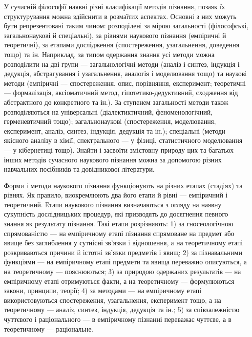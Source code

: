 У сучасній філософії наявні різні класифікації методів пізнання, позаяк їх
структурування можна здійснити в розмаїтих аспектах. Основні з них можуть
бути репрезентовані таким чином: розподілені за мірою загальності
(філософські, загальнонаукові й спеціальні), за рівнями наукового пізнання
(емпіричні й теоретичні), за етапами дослідження (спостереження,
узагальнення, доведення тощо) та ін. Наприклад, за типом одержання знання
усі методи можна розподілити на дві групи --- загальнологічні методи (аналіз і
синтез, індукція і дедукція, абстрагування і узагальнення, аналогія і
моделювання тощо) та наукові методи (емпіричні --- спостереження, опис,
порівняння, експеримент; теоретичні --- формалізація, аксіоматичний метод,
гіпотетико-дедуктивний, сходження від абстрактного до конкретного та ін.). За
ступенем загальності методи також розподіляються на універсальні
(діалектиктичний, феноменологічний, герменевтичний тощо); загальнонаукові
(спостереження, моделювання, експеримент, аналіз, синтез, індукція, дедукція
та ін.); спеціальні (методи якісного аналізу в хімії, спектрального --- у фізиці,
статистичного моделювання --- у кібернетиці тощо). Знайти і засвоїти змістовну
природу цих та багатьох інших методів сучасного наукового пізнання можна за
допомогою різних навчальних посібників та довідникової літератури.

Форми і методи наукового пізнання функціонують на різних етапах
(стадіях) та рівнях. Як правило, виокремлюють два його етапи й рівні ---
емпіричний і теоретичний. Етапи наукового пізнання визначаються з огляду на
наявну сукупність дослідницьких процедур, які призводять до досягнення
певного знання як результату пізнання. Такі етапи розрізняють: 1) за
гносеологічною спрямованістю --- на емпіричному етапі пізнання спрямоване на
предмет або явище без заглиблення у сутнісні зв’язки і відношення, а на
теоретичному етапі розкриваються причини й істотні зв’язки предметів і явищ;
2) за пізнавальними функціями --- на емпіричному етапі предмети та явища
переважно описуються, а на теоретичному --- пояснюються; 3) за природою
одержаних результатів --- на емпіричному етапі отримуються факти, а на
теоретичному --- формулюються закони, принципи, теорії; 4) за методами --- на
емпіричному етапі використовуються спостереження, узагальнення,
експеримент тощо, а на теоретичному --- аналіз, синтез, індукція, дедукція та ін.;
5) за співзалежністю чуттєвого і раціонального --- в емпіричному пізнанні
переважає чуттєве, а в теоретичному --- раціональне.

